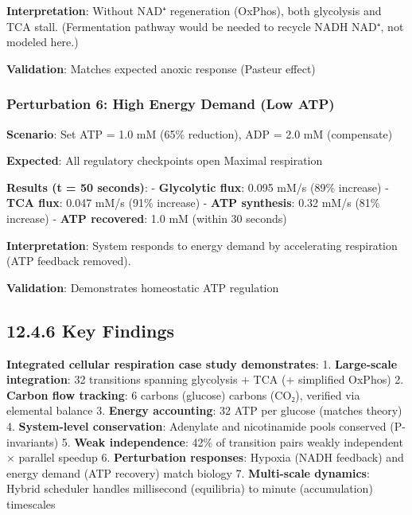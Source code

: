\textbf{Interpretation}: Without NAD⁺ regeneration (OxPhos), both
glycolysis and TCA stall. (Fermentation pathway would be needed to
recycle NADH \textrightarrow NAD⁺, not modeled here.)

\textbf{Validation}: Matches expected anoxic response (Pasteur effect) \checkmark

\hypertarget{perturbation-6-high-energy-demand-low-atp}{%
\subsubsection{Perturbation 6: High Energy Demand (Low
ATP)}\label{perturbation-6-high-energy-demand-low-atp}}

\textbf{Scenario}: Set ATP = 1.0 mM (65\% reduction), ADP = 2.0 mM
(compensate)

\textbf{Expected}: All regulatory checkpoints open \textrightarrow Maximal respiration

\textbf{Results (t = 50 seconds)}: - \textbf{Glycolytic flux}: 0.095  mM/s (89\% increase) - \textbf{TCA flux}: 0.047  mM/s (91\%
increase) - \textbf{ATP synthesis}: 0.32  mM/s (81\% increase) -
\textbf{ATP recovered}: 1.0  mM (within 30 seconds)

\textbf{Interpretation}: System responds to energy demand by
accelerating respiration (ATP feedback removed).

\textbf{Validation}: Demonstrates homeostatic ATP regulation \checkmark

\hypertarget{key-findings-2}{%
\subsection{12.4.6 Key Findings}\label{key-findings-2}}

\textbf{Integrated cellular respiration case study demonstrates}: 1.
\textbf{Large-scale integration}: 32 transitions spanning glycolysis +
TCA (+ simplified OxPhos) 2. \textbf{Carbon flow tracking}: 6 carbons
(glucose)  carbons (CO₂), verified via elemental balance 3.
\textbf{Energy accounting}: 32 ATP per glucose (matches theory) 4.
\textbf{System-level conservation}: Adenylate and nicotinamide pools
conserved (P-invariants) 5. \textbf{Weak independence}: 42\% of
transition pairs weakly independent × parallel speedup 6.
\textbf{Perturbation responses}: Hypoxia (NADH feedback) and energy
demand (ATP recovery) match biology 7. \textbf{Multi-scale dynamics}:
Hybrid scheduler handles millisecond (equilibria) to minute
(accumulation) timescales

